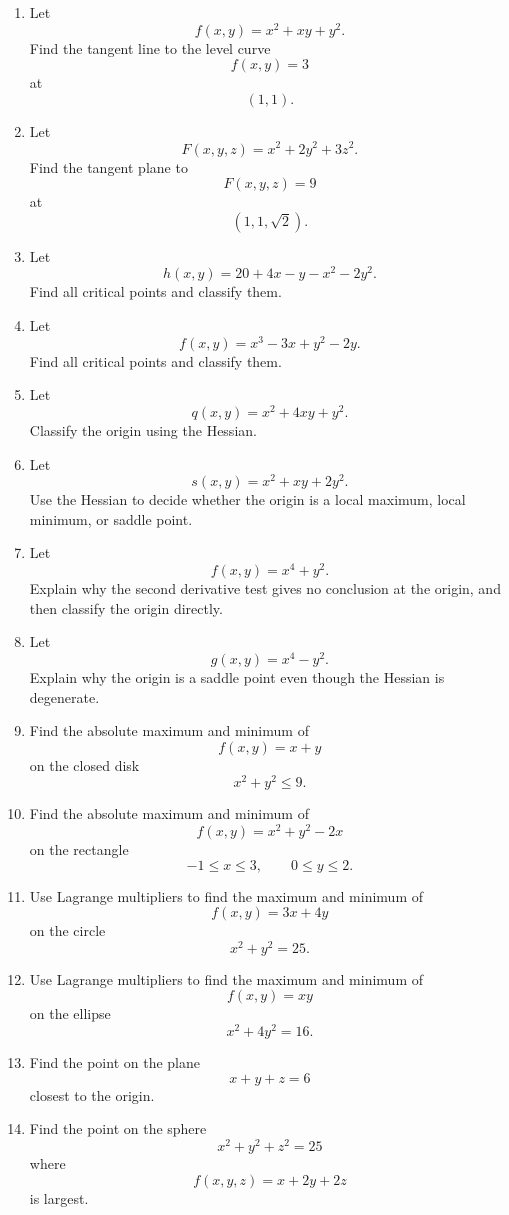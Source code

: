 \begin{enumerate}
\item Let
\[
    f(x,y)=x^2+xy+y^2.
\]
Find the tangent line to the level curve
\[
    f(x,y)=3
\]
at
\[
    (1,1).
\]

\item Let
\[
    F(x,y,z)=x^2+2y^2+3z^2.
\]
Find the tangent plane to
\[
    F(x,y,z)=9
\]
at
\[
    (1,1,\sqrt2).
\]

\item Let
\[
    h(x,y)=20+4x-y-x^2-2y^2.
\]
Find all critical points and classify them.

\item Let
\[
    f(x,y)=x^3-3x+y^2-2y.
\]
Find all critical points and classify them.

\item Let
\[
    q(x,y)=x^2+4xy+y^2.
\]
Classify the origin using the Hessian.

\item Let
\[
    s(x,y)=x^2+xy+2y^2.
\]
Use the Hessian to decide whether the origin is a local maximum, local minimum, or
saddle point.

\item Let
\[
    f(x,y)=x^4+y^2.
\]
Explain why the second derivative test gives no conclusion at the origin, and then
classify the origin directly.

\item Let
\[
    g(x,y)=x^4-y^2.
\]
Explain why the origin is a saddle point even though the Hessian is degenerate.

\item Find the absolute maximum and minimum of
\[
    f(x,y)=x+y
\]
on the closed disk
\[
    x^2+y^2\le 9.
\]

\item Find the absolute maximum and minimum of
\[
    f(x,y)=x^2+y^2-2x
\]
on the rectangle
\[
    -1\le x\le3,
    \qquad
    0\le y\le2.
\]

\item Use Lagrange multipliers to find the maximum and minimum of
\[
    f(x,y)=3x+4y
\]
on the circle
\[
    x^2+y^2=25.
\]

\item Use Lagrange multipliers to find the maximum and minimum of
\[
    f(x,y)=xy
\]
on the ellipse
\[
    x^2+4y^2=16.
\]

\item Find the point on the plane
\[
    x+y+z=6
\]
closest to the origin.

\item Find the point on the sphere
\[
    x^2+y^2+z^2=25
\]
where
\[
    f(x,y,z)=x+2y+2z
\]
is largest.


\end{enumerate}
